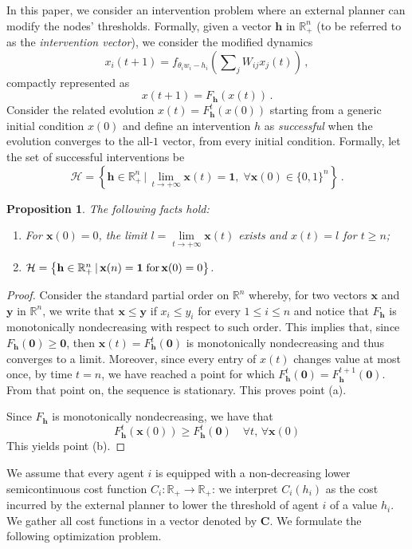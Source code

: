 \documentclass[12pt,twoside,reqno]{amsart}
\newtheorem{proposition}[theorem]{Proposition}
\theoremstyle{definition}
\numberwithin{equation}{section}
\newcommand{\be}{\begin{equation}}
\newcommand{\ee}{\end{equation}}
\newcommand{\mc}{\mathcal}
\newcommand{\0}{\mathbf{0}}
\newcommand{\1}{\mathbf{1}}
\newcommand{\x}{\mathbf{x}}
\newcommand{\R}{\mathbb{R}}
\newcommand{\y}{\mathbf{y}}
\newcommand{\infl}{h}
\newcommand{\Infl}{\mathbf{\infl}}
\newcommand{\thre}{\theta}
\begin{document}
In this paper, we consider an intervention problem where an external planner can modify the nodes' thresholds. Formally, given a vector $\Infl$ in $\R_+^{n}$ (to be referred to as the \emph{intervention vector}), we consider the modified dynamics 
\be\label{LTE1int}x_i(t+1)=f_{\thre_iw_i-h_i}\left(\sum\nolimits_{j}W_{ij}x_j(t)\right)\,,\ee
compactly represented as
\be\label{LTE2int}x(t+1)=F_{\Infl}(x(t))\,.\ee
Consider the related evolution $x(t)=F^t_{\Infl}(x(0))$ starting from a generic initial condition $x(0)$ and define an intervention $h$ as  \emph{successful} when the evolution converges to the all-$1$ vector, from every initial condition. Formally, let the set of successful interventions be
\be\mc H=\left\{\Infl\in \R_+^{n}\,|\, \lim\limits_{t\to +\infty}\x(t)=\1,\;\forall \x(0)\in\{0,1\}^{n}\right\}\,.\ee
\begin{proposition}\label{prop:reprH} The following facts hold:
\begin{enumerate}
\item[(a)] For $\x(0)=0$, the limit $l= \lim\limits_{t\to +\infty}\x(t)$ exists and $x(t)=l$ for $t\geq n$;
\item[(b)] $\mc H=\left\{\Infl\in \R_+^{n}\,|\, \x(n)=\1\;\hbox{for}\, \x(0)=0\right\}$.
\end{enumerate}
\end{proposition}
\begin{proof}
Consider the standard partial order on $\R^{n}$ whereby, for two vectors $\x$ and $\y$ in $\R^{n}$, we write that $\x\leq\y$ if $x_i\leq y_i$ for every $1\le i\le n$ and notice that $F_{\Infl}$ is monotonically nondecreasing with respect to such order. This implies that, since $F_{\Infl}(\0)\geq \0$, then $\x(t)=F^t_{\Infl}(\0)$ is monotonically nondecreasing and thus converges to a limit. Moreover, since every entry of $x(t)$ changes value at most once, by time $t=n$, we have reached a point for which $F^t_{\Infl}(\0)=F^{t+1}_{\Infl}(\0)$. From that point on, the sequence is stationary. This proves point (a).

Since $F_{\Infl}$ is monotonically nondecreasing, we have that
$$F^t_{\Infl}(\x(0))\geq F^t_{\Infl}(\0)\quad\forall t,\,\forall \x(0)$$
This yields point (b).
\end{proof}

We assume that every agent $i$ is equipped with a non-decreasing lower semicontinuous cost function $C_i:\R_+\to\R_+$: we interpret $C_i(\infl_i)$ as the cost incurred by the external planner to lower the threshold of agent $i$ of a value $\infl_i$. We gather all cost functions in a vector denoted by $\mathbf C$.
We formulate the following optimization problem.
\end{document}
